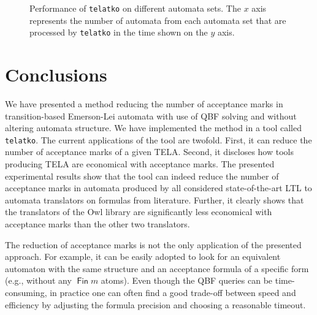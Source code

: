 \documentclass[a4paper,UKenglish,cleveref,autoref,thm-restate]{lipics-v2021}
\newcommand{\todo}[1]{\marginpar{\textcolor{red}{#1}}}
\DeclareMathOperator{\Fin}{\mathsf{Fin}}
\newcommand{\telatko}{\texttt{telatko}\xspace}
\begin{document}
\todo{popisek Fig. 3 neni hezky. Je to wall time nebo CPU time? Je to
  kumulovany cas nebo pro kazdy automat zvlast? Zmenit popisky os v
  obrazku?}
\begin{figure}[b!]
  \caption{Performance of \telatko on different automata sets. The $x$
    axis represents the number of automata from each automata
    set that are processed by \telatko in the time shown on the $y$
    axis.}
\label{fig:quantile}
\bigskip
\centering

\end{figure}





\section{Conclusions}\label{sec:conclusion}

We have presented a method reducing the number of acceptance marks in
transition-based Emerson-Lei automata with use of QBF solving and
without altering automata structure. We have implemented the method in
a tool called \texttt{telatko}. The current applications of the tool
are twofold. First, it can reduce the number of acceptance marks of a
given TELA. Second, it discloses how tools producing TELA are
economical with acceptance marks. The presented experimental results
show that the tool can indeed reduce the number of acceptance marks in
automata produced by all considered state-of-the-art LTL to automata
translators on formulas from literature. Further, it clearly shows
that the translators of the Owl library are significantly less
economical with acceptance marks than the other two translators.

The reduction of acceptance marks is not the only application of the
presented approach. For example, it can be easily adopted to look for
an equivalent automaton with the same structure and an acceptance
formula of a specific form (e.g., without any $\Fin m$ atoms). Even
though the QBF queries can be time-consuming, in practice one can
often find a good trade-off between speed and efficiency by adjusting 
the formula precision and choosing a reasonable timeout.
\end{document}
